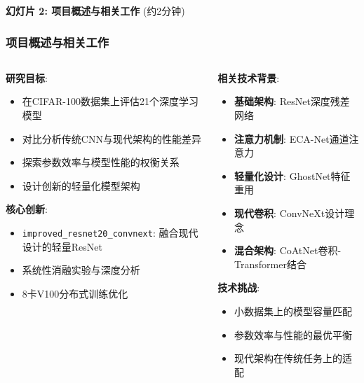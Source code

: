 \documentclass[10pt]{beamer}
\begin{document}
\begin{frame}{\textbf{幻灯片 2: 项目概述与相关工作} (约2分钟)}
\frametitle{项目概述与相关工作}

{\small
\begin{columns}[T]
    \begin{column}{0.5\textwidth}
        \textbf{研究目标}:
        \begin{itemize}
            \item 在CIFAR-100数据集上评估21个深度学习模型 \cite{Krizhevsky2009Learning}
            \item 对比分析传统CNN与现代架构的性能差异
            \item 探索参数效率与模型性能的权衡关系
            \item 设计创新的轻量化模型架构
        \end{itemize}
        
        \vspace{0.3em}
        \textbf{核心创新}:
        \begin{itemize}
            \item \texttt{improved\_resnet20\_convnext}: 融合现代设计的轻量ResNet
            \item 系统性消融实验与深度分析
            \item 8卡V100分布式训练优化
        \end{itemize}
    \end{column}
    \begin{column}{0.5\textwidth}
        \textbf{相关技术背景}:
        \begin{itemize}
            \item \textbf{基础架构}: ResNet深度残差网络 \cite{He2016Deep}
            \item \textbf{注意力机制}: ECA-Net通道注意力 \cite{Wang_2020_CVPR}
            \item \textbf{轻量化设计}: GhostNet特征重用 \cite{Han2020GhostNet}
            \item \textbf{现代卷积}: ConvNeXt设计理念 \cite{Liu2022ConvNet}
            \item \textbf{混合架构}: CoAtNet卷积-Transformer结合 \cite{Dai2021CoAtNet}
        \end{itemize}
        
        \vspace{0.3em}
        \textbf{技术挑战}:
        \begin{itemize}
            \item 小数据集上的模型容量匹配
            \item 参数效率与性能的最优平衡
            \item 现代架构在传统任务上的适配
        \end{itemize}
    \end{column}
\end{columns}
}

\end{frame}
\end{document}

